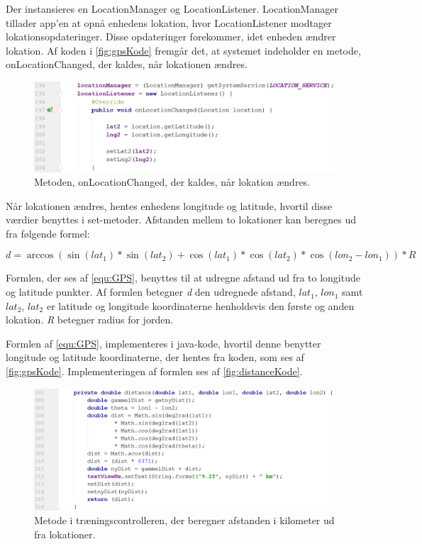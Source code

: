 Der instansieres en LocationManager og LocationListener. LocationManager tillader app'en at opnå enhedens lokation, hvor LocationListener modtager lokationsopdateringer. Disse opdateringer forekommer, idet enheden ændrer lokation.\cite{LocationManager, LocationListener} Af koden i \autoref{fig:gpsKode} fremgår det, at systemet indeholder en metode, onLocationChanged, der kaldes, når lokationen ændres. 

\begin{figure} [H]
\centering
\includegraphics[width=1\textwidth]{figures/imple/gpsKode}
\caption{Metoden, onLocationChanged, der kaldes, når lokation ændres.}
\label{fig:gpsKode}
\end{figure} 

Når lokationen ændres, hentes enhedens longitude og latitude, hvortil disse værdier benyttes i set-metoder. Afstanden mellem to lokationer kan beregnes ud fra følgende formel:

\begin{equation} \label{equ:GPS}
d = \arccos(\sin(lat_1)*\sin(lat_2)+\cos(lat_1)*\cos(lat_2)*\cos(lon_2-lon_1))*R
\end{equation}

Formlen, der ses af \autoref{equ:GPS}, benyttes til at udregne afstand ud fra to longitude og latitude punkter. Af formlen betegner \textit{d} den udregnede afstand, \textit{$lat_1$}, \textit{$lon_1$} samt \textit{$lat_2$}, \textit{$lat_2$} er latitude og longitude koordinaterne henholdsvis den første og anden lokation. \textit{R} betegner radius for jorden.    

Formlen af \autoref{equ:GPS}, implementeres i java-kode, hvortil denne benytter longitude og latitude koordinaterne, der hentes fra koden, som ses af \autoref{fig:gpsKode}. Implementeringen af formlen ses af \autoref{fig:distanceKode}.

\begin{figure} [H]
\centering
\includegraphics[width=1\textwidth]{figures/imple/distanceKode}
\caption{Metode i træningscontrolleren, der beregner afstanden i kilometer ud fra lokationer.}
\label{fig:distanceKode}
\end{figure} 

